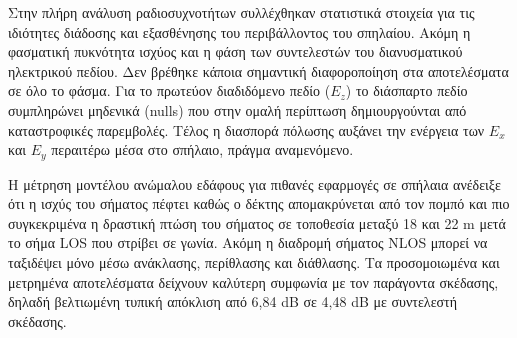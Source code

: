         Στην πλήρη ανάλυση ραδιοσυχνοτήτων \cite{pingenot_full_2005} συλλέχθηκαν στατιστικά στοιχεία
        για τις ιδιότητες διάδοσης και εξασθένησης του περιβάλλοντος του σπηλαίου. Ακόμη η φασματική
        πυκνότητα ισχύος και η φάση των συντελεστών του διανυσματικού ηλεκτρικού πεδίου. Δεν βρέθηκε
        κάποια σημαντική διαφοροποίηση στα αποτελέσματα σε όλο το φάσμα. Για το πρωτεύον διαδιδόμενο
        πεδίο ($E_z$) το διάσπαρτο πεδίο συμπληρώνει μηδενικά (nulls) που στην ομαλή περίπτωση 
        δημιουργούνται από καταστροφικές παρεμβολές. Τέλος η διασπορά πόλωσης αυξάνει την ενέργεια
        των $E_x$ και $E_y$ περαιτέρω μέσα στο σπήλαιο, πράγμα αναμενόμενο.

        Η μέτρηση μοντέλου ανώμαλου εδάφους για πιθανές εφαρμογές σε σπήλαια \cite{soo_measurement_2019}
        ανέδειξε ότι η ισχύς του σήματος πέφτει καθώς ο δέκτης απομακρύνεται από τον πομπό και πιο
        συγκεκριμένα η δραστική πτώση του σήματος σε τοποθεσία μεταξύ 18 και 22 m μετά το σήμα LOS
        που στρίβει σε γωνία. Ακόμη η διαδρομή σήματος NLOS μπορεί να ταξιδέψει μόνο μέσω ανάκλασης,
        περίθλασης και διάθλασης. Τα προσομοιωμένα και μετρημένα αποτελέσματα δείχνουν καλύτερη συμφωνία
        με τον παράγοντα σκέδασης, δηλαδή βελτιωμένη τυπική απόκλιση από 6,84 dB σε 4,48 dB με συντελεστή
        σκέδασης.